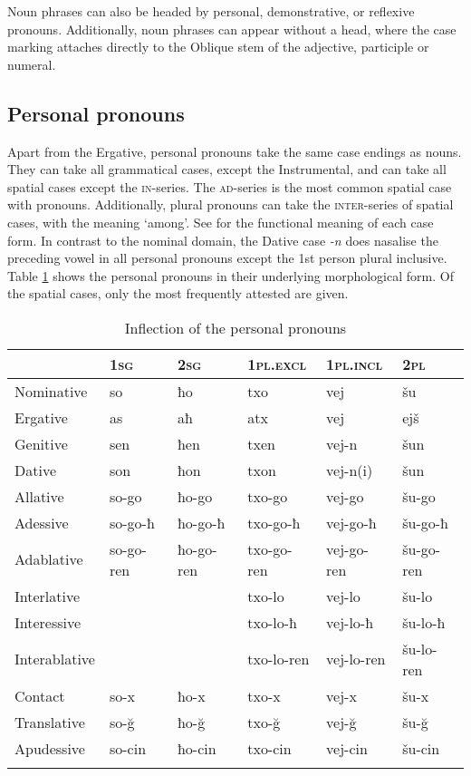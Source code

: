 Noun phrases can also be headed by personal, demonstrative, or reflexive pronouns. Additionally, noun phrases can appear without a head, where the case marking attaches directly to the Oblique stem of the adjective, participle or numeral.


\subsection{Personal pronouns} \label{perspro}

Apart from the Ergative, personal pronouns take the same case endings as nouns. They can take all grammatical cases, except the Instrumental, and can take all spatial cases except the \textsc{in}-series. The \textsc{ad}-series is the most common spatial case with pronouns. Additionally, plural pronouns can take the \textsc{inter}-series of spatial cases, with the meaning `among'. See  for the functional meaning of each case form. In contrast to the nominal domain, the Dative case \textit{-n} does nasalise the preceding vowel in all personal pronouns except the 1st person plural inclusive. Table \ref{tableperspro} shows the personal pronouns in their underlying morphological form. Of the spatial cases, only the most frequently attested are given.

\begin{table}
	\begin{tabular}{llllll}
    \lsptoprule
		& {1\textsc{sg}} & {2\textsc{sg}} & {1\textsc{pl.excl}} & {1\textsc{pl.incl}} & {2\textsc{pl}} \\
		\midrule
		{Nominative} & so & ħo & txo & vej & šu \\
		{Ergative} & as & aħ & atx & vej & ejš \\
		{Genitive} & sen & ħen & txen & vej-n & šun \\
		{Dative} & son & ħon & txon & vej-n(i) & šun \\
		
		
		\midrule
		
		{Allative} & so-go & ħo-go & txo-go & vej-go & šu-go \\
		{Adessive} & so-go-ħ & ħo-go-ħ & txo-go-ħ & vej-go-ħ & šu-go-ħ \\
		{Adablative} & so-go-ren & ħo-go-ren & txo-go-ren & vej-go-ren  & šu-go-ren \\
		{Interlative} & & & txo-lo & vej-lo  & šu-lo \\
		{Interessive} & & & txo-lo-ħ & vej-lo-ħ & šu-lo-ħ \\
		{Interablative} & & & txo-lo-ren & vej-lo-ren & šu-lo-ren \\
		{Contact} & so-x & ħo-x & txo-x & vej-x & šu-x \\
		{Translative} & so-\u{g} & ħo-\u{g} & txo-\u{g} & vej-\u{g} & šu-\u{g} \\
		{Apudessive} & so-cin & ħo-cin & txo-cin & vej-cin & šu-cin \\
		\lspbottomrule
	\end{tabular}
	\caption{Inflection of the personal pronouns}
	\label{tableperspro}
\end{table}


